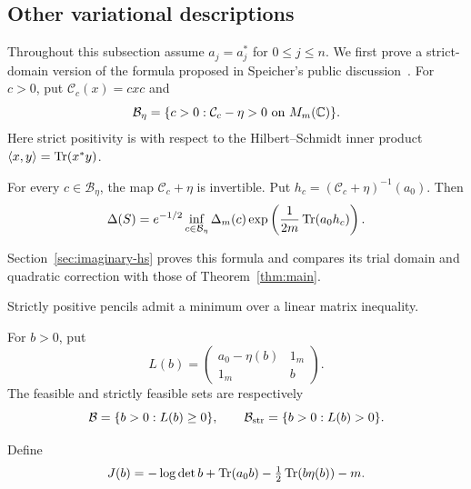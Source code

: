 \subsection{Other variational descriptions}
Throughout this subsection assume $a_j=a_j^*$ for $0\le j\le n$.
We first prove a strict-domain version of the formula proposed in Speicher's public discussion~\cite{Spe26}.
For $c>0$, put $\mathcal C_c(x)=cxc$ and
\begin{equation}\label{eq:hs-domain}
 \mathcal B_\eta=
 \{c>0:\mathcal C_c-\eta>0\text{ on }M_m(\mathbb C)\}.
\end{equation}
Here strict positivity is with respect to the Hilbert--Schmidt inner product $\langle x,y\rangle=\operatorname{Tr}(x^*y)$.

\begin{proposition}\label{prop:hs-formula}
For every $c\in\mathcal B_\eta$, the map $\mathcal C_c+\eta$ is invertible.
Put $h_c=(\mathcal C_c+\eta)^{-1}(a_0)$.
Then
\begin{equation}\label{eq:hs-determinant}
 \Delta(S)=e^{-1/2}\inf_{c\in\mathcal B_\eta}
       \Delta_m(c)\exp\left(\frac1{2m}\operatorname{Tr}(a_0h_c)\right).
\end{equation}
\end{proposition}
Section~\ref{sec:imaginary-hs} proves this formula and compares its trial domain and quadratic correction with those of Theorem~\ref{thm:main}.

Strictly positive pencils admit a minimum over a linear matrix inequality.
\begin{definition}\label{def:positive-feasibility}
For $b>0$, put
\begin{equation}\label{eq:positive-lmi}
 L(b)=\begin{pmatrix}a_0-\eta(b)&1_m\\1_m&b\end{pmatrix}.
\end{equation}
The feasible and strictly feasible sets are respectively
\begin{equation}\label{eq:feasible-set}
 \mathcal B=\{b>0:L(b)\ge0\},\qquad
 \mathcal B_{\rm str}=\{b>0:L(b)>0\}.
\end{equation}
\end{definition}
Define
\begin{equation}\label{eq:positive-objective}
 J(b)=-\log\det b+\operatorname{Tr}(a_0b)-\tfrac12\operatorname{Tr}(b\eta(b))-m.
\end{equation}

